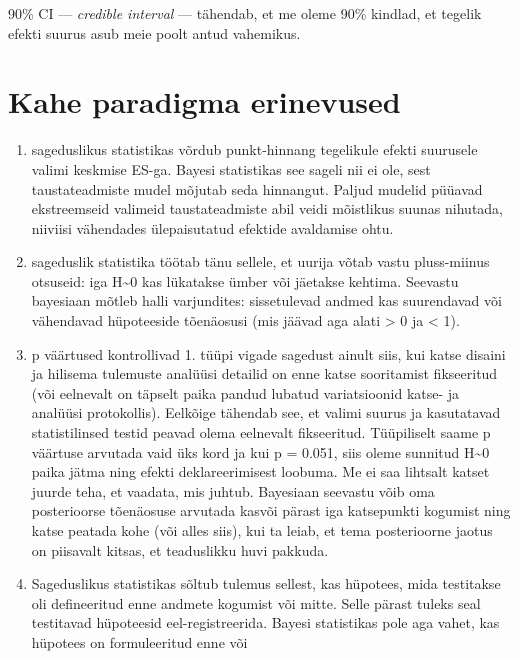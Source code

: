 \documentclass[]{book}
\begin{document}
90\% CI --- \emph{credible interval} --- tähendab, et me oleme 90\%
kindlad, et tegelik efekti suurus asub meie poolt antud vahemikus.

\section*{Kahe paradigma erinevused}\label{kahe-paradigma-erinevused}

\begin{enumerate}
\def\labelenumi{\arabic{enumi}.}
\item
  sageduslikus statistikas võrdub punkt-hinnang tegelikule efekti
  suurusele valimi keskmise ES-ga. Bayesi statistikas see sageli nii ei
  ole, sest taustateadmiste mudel mõjutab seda hinnangut. Paljud mudelid
  püüavad ekstreemseid valimeid taustateadmiste abil veidi mõistlikus
  suunas nihutada, niiviisi vähendades ülepaisutatud efektide avaldamise
  ohtu.
\item
  sageduslik statistika töötab tänu sellele, et uurija võtab vastu
  pluss-miinus otsuseid: iga H\textasciitilde{}0 kas lükatakse ümber või
  jäetakse kehtima. Seevastu bayesiaan mõtleb halli varjundites:
  sissetulevad andmed kas suurendavad või vähendavad hüpoteeside
  tõenäosusi (mis jäävad aga alati \textgreater{} 0 ja \textless{} 1).
\item
  p väärtused kontrollivad 1. tüüpi vigade sagedust ainult siis, kui
  katse disaini ja hilisema tulemuste analüüsi detailid on enne katse
  sooritamist fikseeritud (või eelnevalt on täpselt paika pandud lubatud
  variatsioonid katse- ja analüüsi protokollis). Eelkõige tähendab see,
  et valimi suurus ja kasutatavad statistilinsed testid peavad olema
  eelnevalt fikseeritud. Tüüpiliselt saame p väärtuse arvutada vaid üks
  kord ja kui p = 0.051, siis oleme sunnitud H\textasciitilde{}0 paika
  jätma ning efekti deklareerimisest loobuma. Me ei saa lihtsalt katset
  juurde teha, et vaadata, mis juhtub. Bayesiaan seevastu võib oma
  posterioorse tõenäosuse arvutada kasvõi pärast iga katsepunkti
  kogumist ning katse peatada kohe (või alles siis), kui ta leiab, et
  tema posterioorne jaotus on piisavalt kitsas, et teaduslikku huvi
  pakkuda.
\item
  Sageduslikus statistikas sõltub tulemus sellest, kas hüpotees, mida
  testitakse oli defineeritud enne andmete kogumist või mitte. Selle
  pärast tuleks seal testitavad hüpoteesid eel-registreerida. Bayesi
  statistikas pole aga vahet, kas hüpotees on formuleeritud enne või

\end{enumerate}
\end{document}

